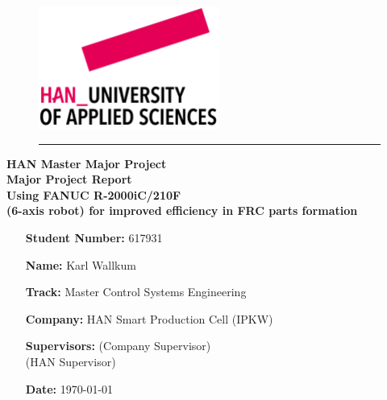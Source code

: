 \begin{titlepage}
	\begin{flushright}
	\begin{minipage}{\linewidth}
		\begin{figure}[H]
			\begin{flushright}
			\includegraphics[width=0.3\linewidth]{Images/HAN_new}
		\end{flushright}
		\hrule
		\end{figure}
		\begin{flushright}
			\large\textbf{ HAN Master Major Project}\\
			\vspace{20pt}
			\Huge\textbf{Major Project Report
			\\
			\vspace{10pt}
			Using FANUC R-2000iC/210F\\
			(6-axis robot) for improved efficiency in FRC parts formation }
		\end{flushright}
		\vspace{20pt}
		\begin{figure}[H]
		\begin{flushleft}
		\end{flushleft}	
		\end{figure}
		\begin{itemize}[leftmargin=4.5cm]
			\LARGE	
			\item[\textbf{Student Number:}] 617931		
			\item[\textbf{Name:}] Karl Wallkum 			
			\item[\textbf{Track:}] Master Control Systems Engineering
			\item[\textbf{Company:}]  HAN Smart Production Cell (IPKW)
			\item[\textbf{Supervisors:}]  \CompanySupervisor (Company Supervisor)\\ \HANSupervisor (HAN Supervisor)			
			\item[\textbf{Date:}] \today	
		\end{itemize}
	\end{minipage}
	\end{flushright}


\end{titlepage}
